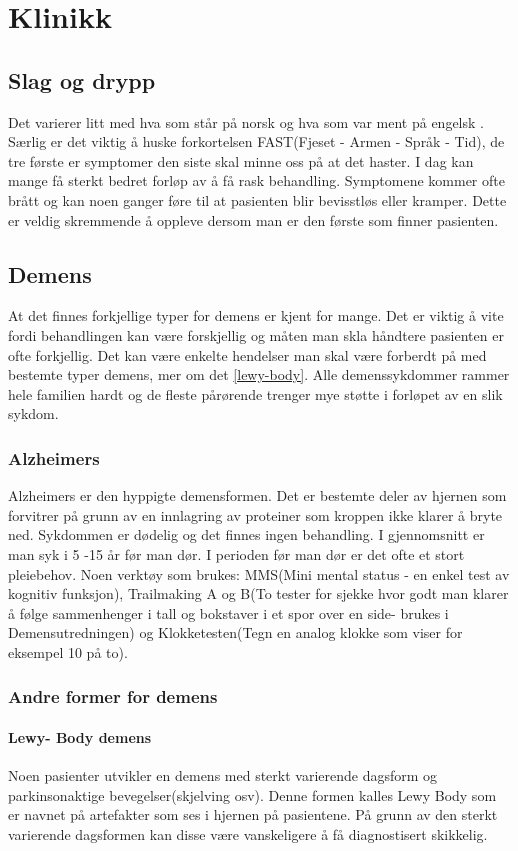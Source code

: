 		\section{Klinikk}
			\subsection{Slag og drypp}
				Det varierer litt med hva som står på norsk og hva som var ment på engelsk\cite{!!!}%
				. Særlig er det viktig å huske forkortelsen FAST(Fjeset - Armen - Språk - Tid), de tre første er symptomer den siste skal minne oss på at det haster. I dag kan mange få sterkt bedret forløp av å få rask behandling. Symptomene kommer ofte brått og kan noen ganger føre til at pasienten blir bevisstløs eller kramper. Dette er veldig skremmende å oppleve dersom man er den første som finner pasienten. 
			\subsection{Demens}
				At det finnes forkjellige typer for demens er kjent for mange. Det er viktig å vite fordi behandlingen kan være forskjellig og måten man skla håndtere pasienten er ofte forkjellig. Det kan være enkelte hendelser man skal være forberdt på med bestemte typer demens, mer om det \ref{lewy-body}. Alle demenssykdommer rammer hele familien hardt og de fleste pårørende trenger mye støtte i forløpet av en slik sykdom.
				\subsubsection{Alzheimers}
					Alzheimers er den hyppigte demensformen. Det er bestemte deler av hjernen som forvitrer på grunn av en innlagring av proteiner som kroppen ikke klarer å bryte ned. Sykdommen er dødelig og det finnes ingen behandling. I gjennomsnitt er man syk i 5 -15 år før man dør. I perioden før man dør er det ofte et stort pleiebehov. Noen verktøy som brukes: MMS(Mini mental status - en enkel test av kognitiv funksjon), Trailmaking A og B(To tester for sjekke hvor godt man klarer å følge sammenhenger i tall og bokstaver i et spor over en side- brukes i Demensutredningen) og Klokketesten(Tegn en analog klokke som viser for eksempel 10 på to). 
				\subsubsection{Andre former for demens}
					\paragraph{Lewy- Body demens\\}
						Noen pasienter utvikler en demens med sterkt varierende dagsform og parkinsonaktige bevegelser(skjelving osv). Denne formen kalles Lewy Body som er navnet på artefakter som ses i hjernen på pasientene. På grunn av den sterkt varierende dagsformen kan disse være vanskeligere å få diagnostisert skikkelig.
